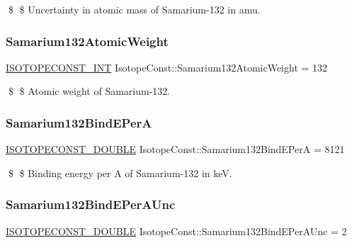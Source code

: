 \$ \$ Uncertainty in atomic mass of Samarium-\/132 in amu. \mbox{\label{group___isotope_const-_samarium-_sm132_ga0c61ea973983fc002ca91bb1863cbe30}} 
\subsubsection{\texorpdfstring{Samarium132\+Atomic\+Weight}{Samarium132AtomicWeight}}
{\footnotesize\ttfamily \mbox{\hyperlink{group___isotope_const-_macros_ga5f18360b3e99483a35c32d789e62621c}{I\+S\+O\+T\+O\+P\+E\+C\+O\+N\+S\+T\+\_\+\+I\+NT}} Isotope\+Const\+::\+Samarium132\+Atomic\+Weight = 132}

\$ \$ Atomic weight of Samarium-\/132. \mbox{\label{group___isotope_const-_samarium-_sm132_ga423a04e519b0258e1f21ab7bd5a9ffec}} 
\subsubsection{\texorpdfstring{Samarium132\+Bind\+E\+PerA}{Samarium132BindEPerA}}
{\footnotesize\ttfamily \mbox{\hyperlink{group___isotope_const-_macros_ga8f45a7272ce02c0b4c65c44636ed719a}{I\+S\+O\+T\+O\+P\+E\+C\+O\+N\+S\+T\+\_\+\+D\+O\+U\+B\+LE}} Isotope\+Const\+::\+Samarium132\+Bind\+E\+PerA = 8121}

\$ \$ Binding energy per A of Samarium-\/132 in keV. \mbox{\label{group___isotope_const-_samarium-_sm132_ga5d539a48f6754c1464a1fdd099ad9cb8}} 
\subsubsection{\texorpdfstring{Samarium132\+Bind\+E\+Per\+A\+Unc}{Samarium132BindEPerAUnc}}
{\footnotesize\ttfamily \mbox{\hyperlink{group___isotope_const-_macros_ga8f45a7272ce02c0b4c65c44636ed719a}{I\+S\+O\+T\+O\+P\+E\+C\+O\+N\+S\+T\+\_\+\+D\+O\+U\+B\+LE}} Isotope\+Const\+::\+Samarium132\+Bind\+E\+Per\+A\+Unc = 2}

